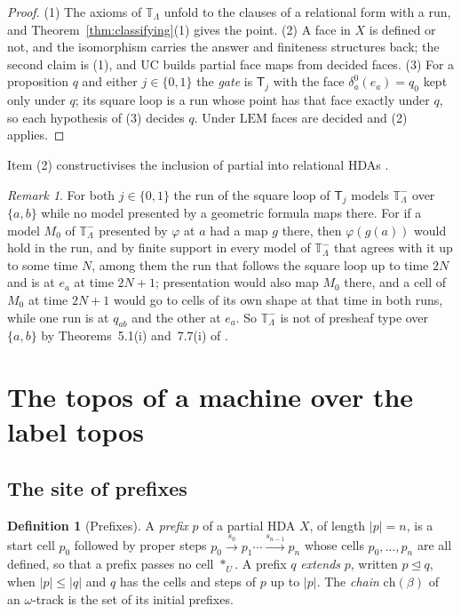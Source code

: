 \documentclass{lmcs}
\theoremstyle{definition}
\newtheorem{definition}[theorem]{Definition}
\theoremstyle{remark}
\newtheorem{remark}[theorem]{Remark}
\newcommand{\Tt}{\mathbb{T}}
\newcommand{\ab}{\{a,b\}}
\newcommand{\dimn}[1]{\lvert #1\rvert}
\newcommand{\prin}[1]{\mathrm{#1}}
\newcommand{\EM}{\prin{LEM}}
\newcommand{\UC}{\prin{UC}}
\newcommand{\TR}{\Tt_{\Lambda}}
\newcommand{\TRm}{\Tt^{-}_{\Lambda}}
\newcommand{\ext}{\trianglelefteq}
\newcommand{\chain}[1]{\mathrm{ch}(#1)}
\begin{document}
\begin{proof}
(1) The axioms of $\TR$ unfold to the clauses of a relational form with a
run, and
Theorem~\ref{thm:classifying}(1) gives the point.
(2) A face in $X$ is defined or not, and the isomorphism carries the answer and finiteness structures
back;
the second claim is (1), and $\UC$ builds partial face maps
from decided faces.
(3) For a proposition $q$ and either $j\in\{0,1\}$ the \emph{gate} is $\mathsf{T}_j$ with the face $\delta^0_a(e_a)=q_0$ kept only under $q$; its
square loop is a run whose point has
that face exactly under $q$, so each hypothesis of (3) decides
$q$.
Under $\EM$ faces are decided and (2) applies.
\end{proof}

Item (2) constructivises the inclusion of partial into relational HDAs
\cite{BDFZ26}.

\begin{remark}\label{rem:not-presheaf}
For both $j\in\{0,1\}$ the run of the square loop of $\mathsf{T}_j$ models $\TRm$ over $\ab$ while no model presented by a
geometric formula maps there. For if a model $M_0$ of $\TRm$ presented by
$\varphi$ at $a$ had a map $g$ there, then $\varphi(g(a))$ would hold in the run, and by finite support in every model of
$\TRm$ that agrees with it up to some time $N$, among them the run that follows the square
loop up to time $2N$ and is at $e_a$ at time $2N+1$; presentation would also map $M_0$ there, and a cell of $M_0$ at
time $2N+1$ would go to cells of its own shape at that time in both runs, while one run is at $q_{ab}$ and the other at
$e_a$. So $\TRm$ is not of presheaf type over $\ab$ by
Theorems~5.1(i) and~7.7(i) of
\cite{Caramello14}.
\end{remark}
\section{The topos of a machine over the label topos}\label{sec:topos}

\subsection{The site of prefixes}\label{ssec:machine}

\begin{definition}[Prefixes]\label{def:prefixes}
A \emph{prefix} $p$ of a partial HDA $X$, of length $\dimn{p}=n$, is a start cell $p_0$ followed by proper steps
$p_0\xrightarrow{s_0}p_1\cdots\xrightarrow{s_{n-1}}p_n$ whose cells $p_0,\dots,p_n$ are all defined, so that a prefix passes no cell
$\ast_U$. A prefix $q$ \emph{extends} $p$, written $p\ext q$, when
$\dimn{p}\leq\dimn{q}$ and $q$ has the cells and steps of $p$ up to $\dimn{p}$. The \emph{chain} $\chain{\beta}$ of
an $\omega$-track is the set of its initial prefixes.
\end{definition}
\end{document}
